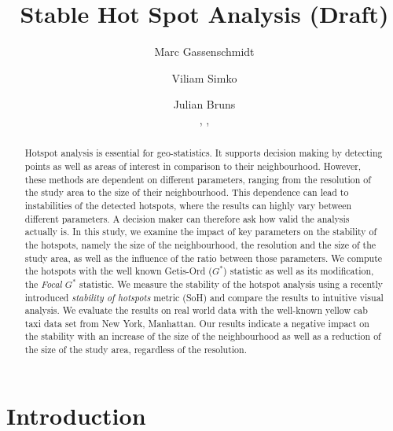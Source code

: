 \documentclass{itatnew}
\begin{document}
\title{Stable Hot Spot Analysis (Draft)}

\author{
  Marc Gassenschmidt \and
  Viliam Simko  \and
  Julian Bruns
  \\
  ,
  ,
}

  
\maketitle              %



\begin{abstract}
Hotspot analysis is essential for geo-statistics.
It supports decision making by detecting points
as well as areas of interest in comparison to their
neighbourhood. However, these methods are dependent
on different parameters, ranging from the resolution
of the study area to the size of their neighbourhood.
This dependence can lead to instabilities of the detected
hotspots, where the results can highly vary between
different parameters. A decision maker can therefore ask
how valid the analysis actually is.
%
In this study, we examine the impact of key parameters
on the stability of the hotspots, namely the size of
the neighbourhood, the resolution and the size of the
study area, as well as the influence of the ratio between
those parameters.
%
We compute the hotspots with the well known Getis-Ord ($G^*$)
statistic as well as its modification, the \emph{Focal $G^*$} statistic.
We measure the stability of the hotspot analysis using
a recently introduced \emph{stability of hotspots} metric (SoH)
and compare the results to intuitive visual analysis.
%
We evaluate the results on real world data with the well-known
yellow cab taxi data set from New York, Manhattan.
Our results indicate a negative impact on the stability with
an increase of the size of the neighbourhood as well as
a reduction of the size of the study area, regardless of
the resolution.
\end{abstract}


\section{Introduction}
\end{document}
